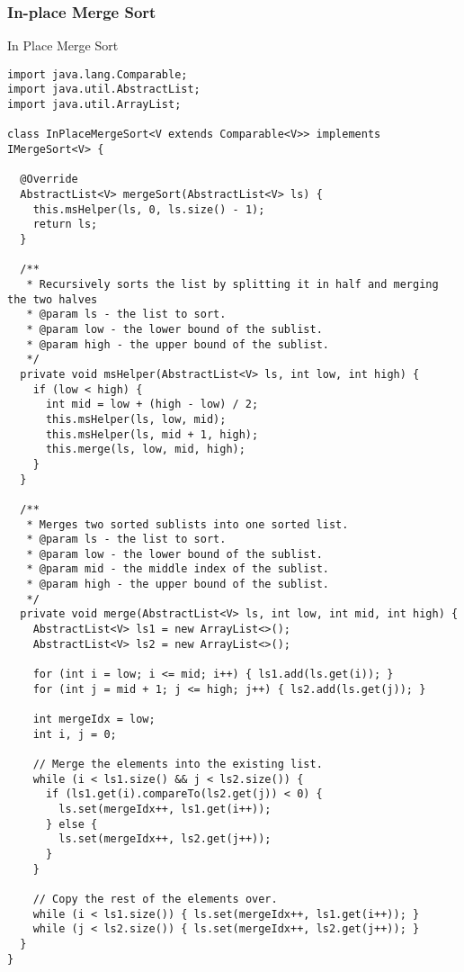 \subsubsection*{In-place Merge Sort}
\begin{cl}[]{In Place Merge Sort}
\begin{lstlisting}[language=MyJava]
import java.lang.Comparable;
import java.util.AbstractList;
import java.util.ArrayList;

class InPlaceMergeSort<V extends Comparable<V>> implements IMergeSort<V> {

  @Override
  AbstractList<V> mergeSort(AbstractList<V> ls) {
    this.msHelper(ls, 0, ls.size() - 1);
    return ls;
  }

  /**
   * Recursively sorts the list by splitting it in half and merging the two halves
   * @param ls - the list to sort.
   * @param low - the lower bound of the sublist. 
   * @param high - the upper bound of the sublist.
   */
  private void msHelper(AbstractList<V> ls, int low, int high) {
    if (low < high) {
      int mid = low + (high - low) / 2;
      this.msHelper(ls, low, mid);
      this.msHelper(ls, mid + 1, high);
      this.merge(ls, low, mid, high);
    }
  }

  /**
   * Merges two sorted sublists into one sorted list. 
   * @param ls - the list to sort.
   * @param low - the lower bound of the sublist.
   * @param mid - the middle index of the sublist.
   * @param high - the upper bound of the sublist.
   */
  private void merge(AbstractList<V> ls, int low, int mid, int high) {
    AbstractList<V> ls1 = new ArrayList<>();
    AbstractList<V> ls2 = new ArrayList<>();

    for (int i = low; i <= mid; i++) { ls1.add(ls.get(i)); }
    for (int j = mid + 1; j <= high; j++) { ls2.add(ls.get(j)); }

    int mergeIdx = low;
    int i, j = 0;
        
    // Merge the elements into the existing list.
    while (i < ls1.size() && j < ls2.size()) {
      if (ls1.get(i).compareTo(ls2.get(j)) < 0) { 
        ls.set(mergeIdx++, ls1.get(i++)); 
      } else { 
        ls.set(mergeIdx++, ls2.get(j++)); 
      }
    }

    // Copy the rest of the elements over.
    while (i < ls1.size()) { ls.set(mergeIdx++, ls1.get(i++)); }
    while (j < ls2.size()) { ls.set(mergeIdx++, ls2.get(j++)); }
  }
}
\end{lstlisting}
\end{cl}

